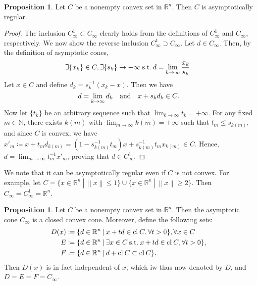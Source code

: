 \documentclass[a4paper,11pt, oneside]{book}
\theoremstyle{definition}
\newtheorem{prop}[dfn]{Proposition}
\newcommand{\NaturalNumberSet}{\mathbb{N}}
\newcommand{\NDemenstionalRealEuclideanSpace}{\mathbb{R}^n}
\newcommand{\Closure}[1]{\text{\rm cl\:${#1}$}} %
\newcommand{\SuchThat}{\:\text{s.t.}\:}
\newcommand{\SetForm}[2]{
  \{{#1}\:|\:{#2}\}
}
\begin{document}
\begin{prop}\label{ConvexSetIsAsymptoticallyRegular}
  Let $C$ be a nonempty convex set in $\NDemenstionalRealEuclideanSpace$. Then $C$ is asymptotically regular.
\end{prop}

\begin{proof}
  The inclusion $C^1_{\infty} \subset C_{\infty}$ clearly holds from the definitions of $C^1_{\infty}$ and $C_{\infty}$, respectively. We now show the reverse inclusion $C^1_{\infty} \supset C_{\infty}$. Let $d \in C_{\infty}$. Then, by the definition of asymptotic cones,
  \begin{equation}
    \exists \{x_k\} \in C, \exists \{s_k\} \to +\infty \SuchThat d = \lim_{k \to \infty} \frac{x_k}{s_k}. \notag
  \end{equation}
  Let $x \in C$ and define $d_k = s_k^{-1}(x_k-x)$. Then we have
  \begin{equation}
    d = \lim_{k \to \infty} d_k \quad \text{and} \quad x + s_k d_k \in C. \notag
  \end{equation}
  Now let $\{t_k\}$ be an arbitrary sequence such that $\lim_{k \to \infty} t_k = +\infty$. For any fixed $m \in \NaturalNumberSet$, there exists $k(m)$ with $\lim_{m \to \infty} k(m) = +\infty$ such that $t_m \leq s_{k(m)}$, and since $C$ is convex, we have $x'_m \coloneqq x +t_m d_{k(m)} = (1-s_{k(m)}^{-1} t_m)x + s_{k(m)}^{-1} t_m x_{k(m)} \in C$. Hence, $d = \lim_{m \to \infty} t_m^{-1} x'_m$, proving that $d \in C^1_{\infty}$.
\end{proof}

We note that it can be asymptotically regular even if $C$ is not convex. For example, let $C = \SetForm{x \in \NDemenstionalRealEuclideanSpace}{\left\lVert x \right\rVert \leq 1} \cup \SetForm{x \in \NDemenstionalRealEuclideanSpace}{\left\lVert x \right\rVert \geq 2}$. Then $C_{\infty} = C_{\infty}^1 = \NDemenstionalRealEuclideanSpace$.

\begin{prop}
  Let $C$ be a nonempty convex set in $\NDemenstionalRealEuclideanSpace$. Then the asymptotic cone $C_{\infty}$ is a closed convex cone. Moreover, define the following sets:
  \begin{equation}
    \begin{split}
      D(x) &\coloneqq \SetForm{d \in \NDemenstionalRealEuclideanSpace}{x+td \in \Closure{C}, \forall t>0}, \forall x \in C \\
      E &\coloneqq \SetForm{d \in \NDemenstionalRealEuclideanSpace}{\exists x \in C \SuchThat x+td \in \Closure{C}, \forall t>0}, \\
      F &\coloneqq \SetForm{d \in \NDemenstionalRealEuclideanSpace}{d + \Closure{C} \subset \Closure{C}}. \notag
    \end{split}
  \end{equation}
  Then $D(x)$ is in fact independent of $x$, which iw thus now denoted by $D$, and $D = E = F = C_{\infty}$.
\end{prop}
\end{document}
